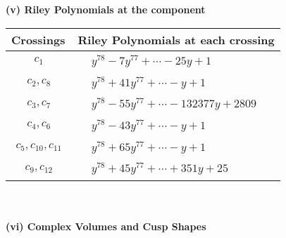 \documentclass[1p]{elsarticle_modified}
\theoremstyle{definition}
\begin{document}
\newpage\renewcommand{\arraystretch}{1}
\flushleft \textbf{(v) Riley Polynomials at the component}\newline \\
\begin{tabular}{m{50pt}|m{274pt}}
Crossings & \hspace{64pt}Riley Polynomials at each crossing \\
\hline $$\begin{aligned}c_{1}\end{aligned}$$&$\begin{aligned}
&y^{78}-7 y^{77}+\cdots-25 y+1
\end{aligned}$\\
\hline $$\begin{aligned}c_{2},c_{8}\end{aligned}$$&$\begin{aligned}
&y^{78}+41 y^{77}+\cdots- y+1
\end{aligned}$\\
\hline $$\begin{aligned}c_{3},c_{7}\end{aligned}$$&$\begin{aligned}
&y^{78}-55 y^{77}+\cdots-132377 y+2809
\end{aligned}$\\
\hline $$\begin{aligned}c_{4},c_{6}\end{aligned}$$&$\begin{aligned}
&y^{78}-43 y^{77}+\cdots- y+1
\end{aligned}$\\
\hline $$\begin{aligned}c_{5},c_{10},c_{11}\end{aligned}$$&$\begin{aligned}
&y^{78}+65 y^{77}+\cdots- y+1
\end{aligned}$\\
\hline $$\begin{aligned}c_{9},c_{12}\end{aligned}$$&$\begin{aligned}
&y^{78}+45 y^{77}+\cdots+351 y+25
\end{aligned}$\\
\hline
\end{tabular}\\~\\
\newpage\flushleft \textbf{(vi) Complex Volumes and Cusp Shapes}
\end{document}
